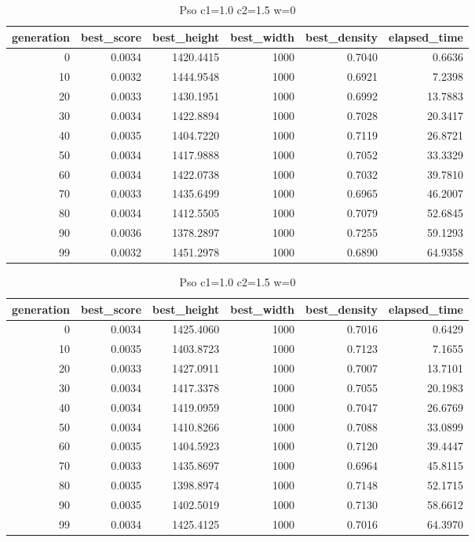 \begin{table}[htbp]
    \centering
    \caption{Pso c1=1.0 c2=1.5 w=0}
    \label{tab:pso_c1_1_0_c2_1_5_w_0}
    \begin{tabular}{rrrrrr}
    \toprule
    generation & best_score & best_height & best_width & best_density & elapsed_time \\
    \midrule
    0 & 0.0034 & 1420.4415 & 1000 & 0.7040 & 0.6636 \\
    10 & 0.0032 & 1444.9548 & 1000 & 0.6921 & 7.2398 \\
    20 & 0.0033 & 1430.1951 & 1000 & 0.6992 & 13.7883 \\
    30 & 0.0034 & 1422.8894 & 1000 & 0.7028 & 20.3417 \\
    40 & 0.0035 & 1404.7220 & 1000 & 0.7119 & 26.8721 \\
    50 & 0.0034 & 1417.9888 & 1000 & 0.7052 & 33.3329 \\
    60 & 0.0034 & 1422.0738 & 1000 & 0.7032 & 39.7810 \\
    70 & 0.0033 & 1435.6499 & 1000 & 0.6965 & 46.2007 \\
    80 & 0.0034 & 1412.5505 & 1000 & 0.7079 & 52.6845 \\
    90 & 0.0036 & 1378.2897 & 1000 & 0.7255 & 59.1293 \\
    99 & 0.0032 & 1451.2978 & 1000 & 0.6890 & 64.9358 \\
    \bottomrule
    \end{tabular}
\end{table}


\begin{table}[htbp]
    \centering
    \caption{Pso c1=1.0 c2=1.5 w=0}
    \label{tab:pso_c1_1_0_c2_1_5_w_0}
    \begin{tabular}{rrrrrr}
    \toprule
    generation & best_score & best_height & best_width & best_density & elapsed_time \\
    \midrule
    0 & 0.0034 & 1425.4060 & 1000 & 0.7016 & 0.6429 \\
    10 & 0.0035 & 1403.8723 & 1000 & 0.7123 & 7.1655 \\
    20 & 0.0033 & 1427.0911 & 1000 & 0.7007 & 13.7101 \\
    30 & 0.0034 & 1417.3378 & 1000 & 0.7055 & 20.1983 \\
    40 & 0.0034 & 1419.0959 & 1000 & 0.7047 & 26.6769 \\
    50 & 0.0034 & 1410.8266 & 1000 & 0.7088 & 33.0899 \\
    60 & 0.0035 & 1404.5923 & 1000 & 0.7120 & 39.4447 \\
    70 & 0.0033 & 1435.8697 & 1000 & 0.6964 & 45.8115 \\
    80 & 0.0035 & 1398.8974 & 1000 & 0.7148 & 52.1715 \\
    90 & 0.0035 & 1402.5019 & 1000 & 0.7130 & 58.6612 \\
    99 & 0.0034 & 1425.4125 & 1000 & 0.7016 & 64.3970 \\
    \bottomrule
    \end{tabular}
\end{table}


